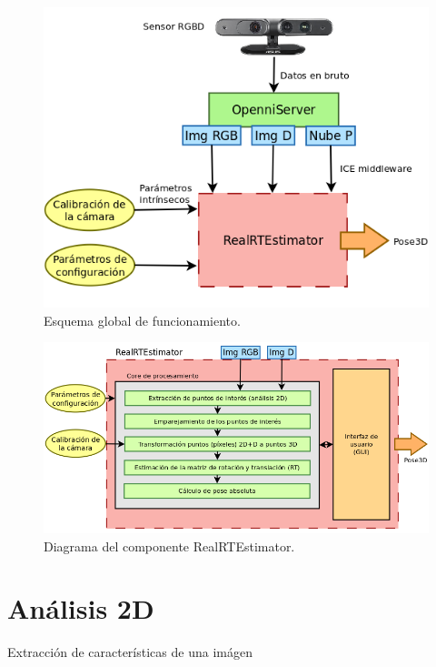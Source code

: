 \begin{figure}[th]
\centering
\includegraphics[scale=0.42]{Figures/diagram1.png}
\decoRule
\caption[Diagram1]{Esquema global de funcionamiento.}
\label{fig:diagram1}
\end{figure}


\begin{figure}[th]
\centering
\includegraphics[scale=0.35]{Figures/diagram2.png}
\decoRule
\caption[Diagram2]{Diagrama del componente RealRTEstimator.}
\label{fig:diagram2}
\end{figure}

\section{Análisis 2D}

Extracción de características de una imágen

